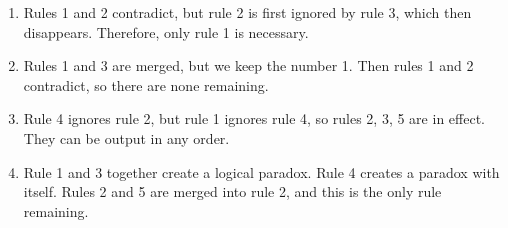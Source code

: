 \begin{enumerate}
    \item Rules 1 and 2 contradict, but rule 2 is first ignored by rule 3, which then disappears. Therefore, only rule 1 is necessary.
    \item Rules 1 and 3 are merged, but we keep the number 1. Then rules 1 and 2 contradict, so there are none remaining.
    \item Rule 4 ignores rule 2, but rule 1 ignores rule 4, so rules 2, 3, 5 are in effect.
    They can be output in any order.
    \item Rule 1 and 3 together create a logical paradox. 
    Rule 4 creates a paradox with itself.
    Rules 2 and 5 are merged into rule 2, and this is the only rule remaining.
    
\end{enumerate}